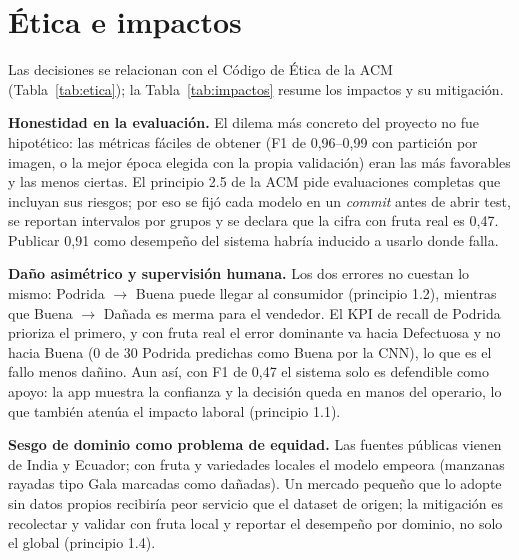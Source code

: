 \documentclass[conference,a4paper]{IEEEtran}
\begin{document}
\section{Ética e impactos}

Las decisiones se relacionan con el Código de Ética de la ACM \cite{acm2018}
(Tabla~\ref{tab:etica}); la Tabla~\ref{tab:impactos} resume los impactos y su mitigación.

\textbf{Honestidad en la evaluación.} El dilema más concreto del proyecto no fue hipotético: las
métricas fáciles de obtener (F1 de 0,96--0,99 con partición por imagen, o la mejor época elegida con
la propia validación) eran las más favorables y las menos ciertas. El principio 2.5 de la ACM pide
evaluaciones completas que incluyan sus riesgos; por eso se fijó cada modelo en un \emph{commit} antes
de abrir test, se reportan intervalos por grupos y se declara que la cifra con fruta real es 0,47.
Publicar 0,91 como desempeño del sistema habría inducido a usarlo donde falla.

\textbf{Daño asimétrico y supervisión humana.} Los dos errores no cuestan lo mismo: Podrida
$\rightarrow$ Buena puede llegar al consumidor (principio 1.2), mientras que Buena $\rightarrow$
Dañada es merma para el vendedor. El KPI de recall de Podrida prioriza el primero, y con fruta real el
error dominante va hacia Defectuosa y no hacia Buena (0 de 30 Podrida predichas como Buena por la
CNN), lo que es el fallo menos dañino. Aun así, con F1 de 0,47 el sistema solo es defendible como apoyo:
la app muestra la confianza y la decisión queda en manos del operario, lo que también atenúa el
impacto laboral (principio 1.1).

\textbf{Sesgo de dominio como problema de equidad.} Las fuentes públicas vienen de India y Ecuador; con
fruta y variedades locales el modelo empeora (manzanas rayadas tipo Gala marcadas como dañadas). Un
mercado pequeño que lo adopte sin datos propios recibiría peor servicio que el dataset de origen; la
mitigación es recolectar y validar con fruta local y reportar el desempeño por dominio, no solo el
global (principio 1.4).
\end{document}
